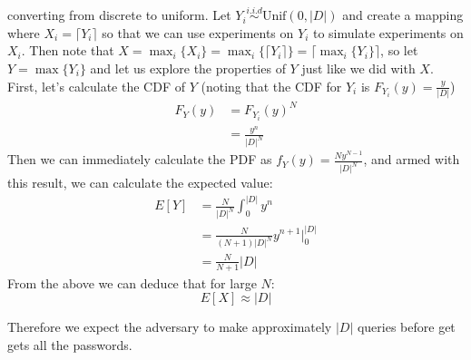 \documentclass{article}
\begin{document}
\begin{enumerate}[noitemsep,topsep=\mdcompacttopsep,start=3]
\begin{enumerate}[noitemsep,topsep=\mdcompacttopsep,label=\alph*.]
converting from discrete to uniform. Let $Y_i \stackrel{i.i.d}{\sim} \text{Unif}(0,|D|)$ and
create a mapping where $X_i = \lceil Y_i \rceil$ so that we can use experiments on $Y_i$
to simulate experiments on $X_i$. Then note that 
$X = \max_i \{X_i \} = \max_i \{ \lceil Y_i \rceil \} = \lceil \max_i \{ Y_i \} \rceil$, so 
let $Y = \max \{Y_i \}$ and let us explore the properties of $Y$ just like we did with $X$. 
First, let's calculate the CDF of $Y$ (noting that the CDF for $Y_i$ is $F_{Y_i}(y) = \frac{y}{|D|}$)
\noindent\noindent\[%
\begin{aligned}
F_Y(y) &= F_{Y_i}(y)^N \\
&= \frac{y^n}{|D|^N}
\end{aligned}
\]%
Then we can immediately calculate the PDF as $f_Y(y) = \frac{Ny^{N-1}}{|D|^N}$, and armed with
this result, we can calculate the expected value:
\noindent\noindent\[%
\begin{aligned}
E[Y] &= \frac{N}{|D|^N} \int_0^{|D|} y^n \\
&= \frac{N}{(N+1)|D|^N}y^{n+1} \biggr|_0^{|D|}\\
&= \frac{N}{N+1}|D|
\end{aligned}
\]%
From the above we can deduce that for large $N$:
\noindent\noindent\[%
E[X] \approx |D| 
\]%

Therefore we expect the adversary to make approximately $|D|$ queries before get gets all 
the passwords.%


\end{enumerate}
\end{enumerate}
\end{document}
